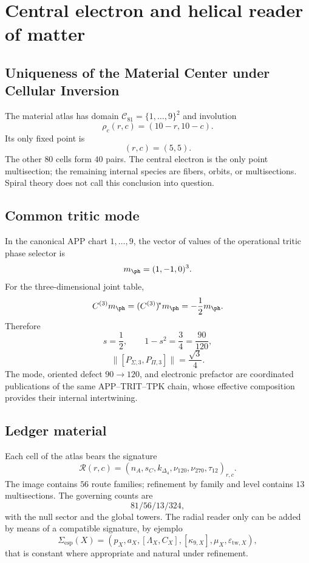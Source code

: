 \chapter{Central electron and helical reader of matter}

\section{Uniqueness of the Material Center under Cellular Inversion}

The material atlas has domain \(\mathcal C_{81}=\{1,\ldots,9\}^2\) and
involution
\[
 \rho_c(r,c)=(10-r,10-c).
\]
Its only fixed point is
\[
 (r,c)=(5,5).
\]
The other \(80\) cells form \(40\) pairs. The central electron is the
only point multisection; the remaining internal species are fibers, orbits,
or multisections. Spiral theory does not call this conclusion into question.

\section{Common tritic mode}

In the canonical APP chart \(1,\ldots,9\), the vector of values of the operational
tritic phase selector is
\[
 m_{\ph}=(1,-1,0)^3.
\]
For the three-dimensional joint table,
\[
 C^{(3)}m_{\ph}=(C^{(3)})^{\!*}m_{\ph}
 =-\frac12m_{\ph}.
\]
Therefore
\[
 s=\frac12,\qquad
 1-s^2=\frac34=\frac{90}{120},
\]
\begin{equation}
 \|[P_{\Sigma,3},P_{\Pi,3}]\|
 =\frac{\sqrt3}{4}.
 \label{espiral:eq:modo-electron-app}
\end{equation}
The mode, oriented defect \(90\to120\), and electronic prefactor are
coordinated publications of the same APP--TRIT--TPK chain, whose effective
composition provides their internal intertwining.

\section{Ledger material}

Each cell of the atlas bears the signature
\[
 \mathcal R(r,c)=
 (n_A,s_C,k_{\Delta_4},\nu_{120},\nu_{270},\tau_{12})_{r,c}.
\]
The image contains \(56\) route families; refinement by family and
level contains \(13\) multisections. The governing counts are
\[
 81/56/13/324,
\]
with the null sector and the global towers. The radial reader only can be added
by means of a compatible signature, by ejemplo
\[
 \Sigma_{\mathrm{esp}}(X)=
 (p_X,a_X,[\Lambda_X,C_X],
 [\kappa_{9,X}],\mu_X,\varepsilon_{{\mathrm{tw}},X}),
\]
that is constant where appropriate and natural under refinement.

